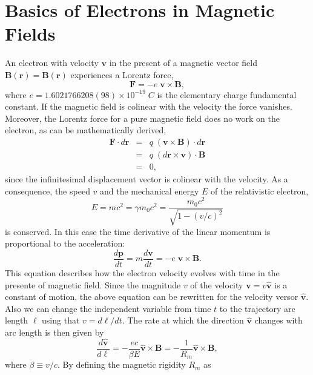 \section{Basics of Electrons in Magnetic Fields}

An electron with velocity $\bm{v}$ in the present of a magnetic vector field $\bm{B}(\bm{r}) = \bm{B}(\bm{r})$ experiences a Lorentz force, 
\begin{equation}
\bm{F} = - e \; \bm{v} \times \bm{B},
\end{equation}
where $e = 1.6021766208(98)\times10^{-19}\;C$ is the elementary charge fundamental constant. If the magnetic field is colinear with the velocity the force vanishes. Moreover, the Lorentz force for a pure magnetic field does no work on the electron, as can be mathematically derived,
\begin{eqnarray}
\bm{F} \cdot d\bm{r} &=& q \; \left( \bm{v} \times \bm{B} \right) \cdot d\bm{r} \nonumber \\
                     &=& q \; \left( d\bm{r} \times \bm{v} \right) \cdot \bm{B} \\
                     &=& 0 \nonumber,
\end{eqnarray}
since the infinitesimal displacement vector is colinear with the velocity. As a consequence, the speed $v$ and the mechanical energy $E$ of the relativistic electron,
\begin{equation}
E = m c^2 = \gamma m_0 c^2 = \frac{m_0 c^2}{\sqrt{1-(v/c)^2}}
\end{equation}
is conserved. In this case the time derivative of the linear momentum is proportional to the acceleration:
\begin{equation}
\frac{d\bm{p}}{dt} = m \frac{d\bm{v}}{dt} = - e \; \bm{v} \times \bm{B}. 
\end{equation}
This equation describes how the electron velocity evolves with time in the presente of magnetic field. Since the magnitude $v$ of the velocity $\bm{v} = v\bm{\hat{v}}$ is a constant of motion, the above equation can be rewritten for the velocity versor $\bm{\hat{v}}$. Also we can change the independent variable from time $t$ to the trajectory arc length $\ell$ using that $v = d\ell/dt$. The rate at which the direction $\bm{\hat{v}}$ changes with arc length is then given by
\begin{equation}
\frac{d\bm{\hat{v}}}{d\ell} = - \frac{ec}{\beta E} \bm{\hat{v}} \times \bm{B} = -\frac{1}{R_m} \bm{\hat{v}} \times \bm{B},
\end{equation}
where $\beta \equiv v/c$. By defining the magnetic rigidity $R_m$ as

